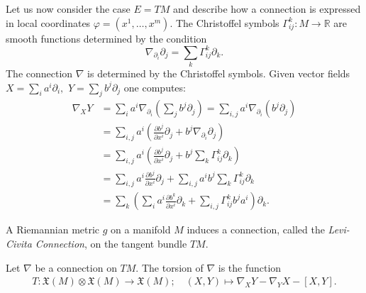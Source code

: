 Let us now consider the case $E=TM$ and describe how a connection is expressed
in local coordinates $\varphi=(x^{1},\dots,x^{m})$. The Christoffel symbols
$\Gamma_{ij}^{k}:M\rightarrow\mathbb{R}$ are smooth functions determined by
the condition \[\nabla_{\partial_{i}}{\partial_{j}}=\sum_{k}%
\Gamma_{ij}^{k}\partial_{k}.\]
The connection $\nabla$ is
determined by the Christoffel symbols. Given vector fields
$X=\sum_{i}a^{i}\partial_{i},$ $Y=\sum_{j}b^{j}\partial_{j}$ one computes:
\begin{align*}
\nabla_{X}Y  &  =\sum_{i}a^{i}\nabla_{\partial_{i}}\left(  \sum_{j}%
b^{j}\partial_{j}\right)  =\sum_{i,j}a^{i}\nabla_{\partial_{i}}\left(
b^{j}\partial_{j}\right) \\
&  =\sum_{i,j}a^{i}\left(  \frac{\partial b^{j}}{\partial x^{i}}\partial
_{j}+b^{j}\nabla_{\partial_{i}}\partial_{j}\right) \\
&  =\sum_{i,j}a^{i}\left(  \frac{\partial b^{j}}{\partial x^{i}}\partial
_{j}+b^{j}\sum_{k}\Gamma_{ij}^{k}\partial_{k}\right) \\
&  =\sum_{i,j}a^{i}\frac{\partial b^{j}}{\partial x^{i}}\partial_{j}%
+\sum_{i,j}a^{i}b^{j}\sum_{k}\Gamma_{ij}^{k}\partial_{k}\\
&  =\sum_{k}\left(  \sum_{i}a^i\frac{\partial b^{k}}{\partial x^{i}}\partial
_{k}+\sum_{i,j}\Gamma_{ij}^{k}b^{j}a^{i}\right)  \partial_{k}.
\end{align*}




A Riemannian metric $g$ on a manifold $M$ induces a connection, called
the \emph{Levi-Civita Connection}, on the tangent bundle $TM$.

\begin{definition}
	Let $\nabla$ be a connection on $TM$. The torsion of $\nabla$ is the function
	\begin{align*}
	T: \mathfrak{X}(M) \otimes\mathfrak{X}(M) \rightarrow\mathfrak{X}(M);
	\quad(X,Y)\mapsto\nabla_{X} Y -\nabla_{Y} X - [X,Y].
	\end{align*}
	
\end{definition}

